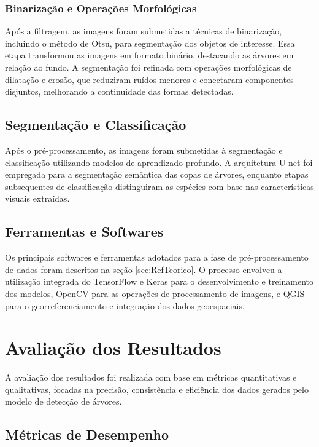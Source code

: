 \documentclass[
    12pt,
    openright,
    oneside,
    a4paper,
    sumario=tradicional,
    english,
    brazil,
    ]{abntex2}
\begin{document}
\subsection{Binarização e Operações Morfológicas}

Após a filtragem, as imagens foram submetidas a técnicas de binarização, incluindo o método de Otsu, para segmentação dos objetos de interesse. Essa etapa transformou as imagens em formato binário, destacando as árvores em relação ao fundo. A segmentação foi refinada com operações morfológicas de dilatação e erosão, que reduziram ruídos menores e conectaram componentes disjuntos, melhorando a continuidade das formas detectadas.

\section{Segmentação e Classificação}

Após o pré-processamento, as imagens foram submetidas à segmentação e classificação utilizando modelos de aprendizado profundo. A arquitetura U-net foi empregada para a segmentação semântica das copas de árvores, enquanto etapas subsequentes de classificação distinguiram as espécies com base nas características visuais extraídas.

\section{Ferramentas e Softwares}

Os principais softwares e ferramentas adotados para a fase de pré-processamento de dados foram descritos na seção \ref{sec:RefTeorico}. O processo envolveu a utilização integrada do TensorFlow e Keras para o desenvolvimento e treinamento dos modelos, OpenCV para as operações de processamento de imagens, e QGIS para o georreferenciamento e integração dos dados geoespaciais.

\chapter{Avaliação dos Resultados}\label{sec:avaliacao}

A avaliação dos resultados foi realizada com base em métricas quantitativas e qualitativas, focadas na precisão, consistência e eficiência dos dados gerados pelo modelo de detecção de árvores.

\section{Métricas de Desempenho}
\end{document}
